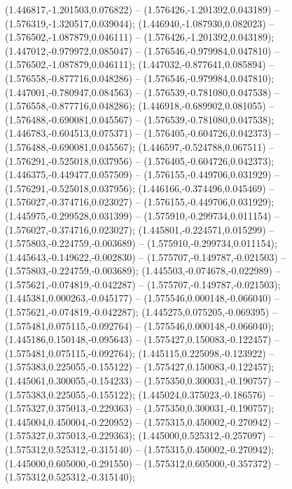  (1.446817,-1.201503,0.076822) -- (1.576426,-1.201392,0.043189) -- (1.576319,-1.320517,0.039044);
 (1.446940,-1.087930,0.082023) -- (1.576502,-1.087879,0.046111) -- (1.576426,-1.201392,0.043189);
 (1.447012,-0.979972,0.085047) -- (1.576546,-0.979984,0.047810) -- (1.576502,-1.087879,0.046111);
 (1.447032,-0.877641,0.085894) -- (1.576558,-0.877716,0.048286) -- (1.576546,-0.979984,0.047810);
 (1.447001,-0.780947,0.084563) -- (1.576539,-0.781080,0.047538) -- (1.576558,-0.877716,0.048286);
 (1.446918,-0.689902,0.081055) -- (1.576488,-0.690081,0.045567) -- (1.576539,-0.781080,0.047538);
 (1.446783,-0.604513,0.075371) -- (1.576405,-0.604726,0.042373) -- (1.576488,-0.690081,0.045567);
 (1.446597,-0.524788,0.067511) -- (1.576291,-0.525018,0.037956) -- (1.576405,-0.604726,0.042373);
 (1.446375,-0.449477,0.057509) -- (1.576155,-0.449706,0.031929) -- (1.576291,-0.525018,0.037956);
 (1.446166,-0.374496,0.045469) -- (1.576027,-0.374716,0.023027) -- (1.576155,-0.449706,0.031929);
 (1.445975,-0.299528,0.031399) -- (1.575910,-0.299734,0.011154) -- (1.576027,-0.374716,0.023027);
 (1.445801,-0.224571,0.015299) -- (1.575803,-0.224759,-0.003689) -- (1.575910,-0.299734,0.011154);
 (1.445643,-0.149622,-0.002830) -- (1.575707,-0.149787,-0.021503) -- (1.575803,-0.224759,-0.003689);
 (1.445503,-0.074678,-0.022989) -- (1.575621,-0.074819,-0.042287) -- (1.575707,-0.149787,-0.021503);
 (1.445381,0.000263,-0.045177) -- (1.575546,0.000148,-0.066040) -- (1.575621,-0.074819,-0.042287);
 (1.445275,0.075205,-0.069395) -- (1.575481,0.075115,-0.092764) -- (1.575546,0.000148,-0.066040);
 (1.445186,0.150148,-0.095643) -- (1.575427,0.150083,-0.122457) -- (1.575481,0.075115,-0.092764);
 (1.445115,0.225098,-0.123922) -- (1.575383,0.225055,-0.155122) -- (1.575427,0.150083,-0.122457);
 (1.445061,0.300055,-0.154233) -- (1.575350,0.300031,-0.190757) -- (1.575383,0.225055,-0.155122);
 (1.445024,0.375023,-0.186576) -- (1.575327,0.375013,-0.229363) -- (1.575350,0.300031,-0.190757);
 (1.445004,0.450004,-0.220952) -- (1.575315,0.450002,-0.270942) -- (1.575327,0.375013,-0.229363);
 (1.445000,0.525312,-0.257097) -- (1.575312,0.525312,-0.315140) -- (1.575315,0.450002,-0.270942);
 (1.445000,0.605000,-0.291550) -- (1.575312,0.605000,-0.357372) -- (1.575312,0.525312,-0.315140);
